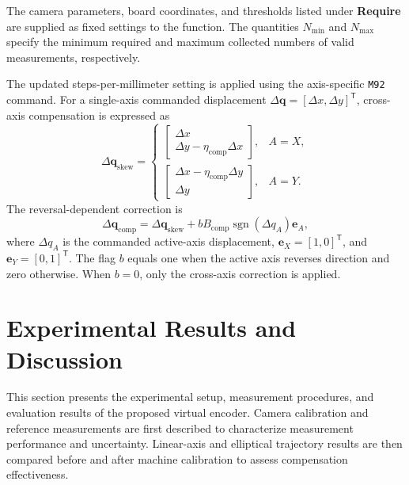 \documentclass[journal]{IEEEtran}
\begin{document}
The camera parameters, board coordinates, and thresholds
listed under \textbf{Require} are supplied as fixed
settings to the function.
The quantities $N_{\mathrm{min}}$ and $N_{\mathrm{max}}$
specify the minimum required and maximum collected
numbers of valid measurements, respectively.

The updated steps-per-millimeter setting is applied
using the axis-specific \texttt{M92} command.
For a single-axis commanded displacement
$\Delta\mathbf q=[\Delta x,\Delta y]^{\mathsf T}$,
cross-axis compensation is expressed as
\begin{equation}
\label{eq:cross_axis_compensation}
\Delta\mathbf q_{\mathrm{skew}}
=
\begin{cases}
\begin{bmatrix}
\Delta x\\
\Delta y-\eta_{\mathrm{comp}}\Delta x
\end{bmatrix},
& A=X,\\[6pt]
\begin{bmatrix}
\Delta x-\eta_{\mathrm{comp}}\Delta y\\
\Delta y
\end{bmatrix},
& A=Y.
\end{cases}
\end{equation}
The reversal-dependent correction is
\begin{equation}
\label{eq:backlash_command_compensation}
\Delta\mathbf q_{\mathrm{comp}}
=
\Delta\mathbf q_{\mathrm{skew}}
+
bB_{\mathrm{comp}}
\operatorname{sgn}(\Delta q_A)\mathbf e_A,
\end{equation}
where $\Delta q_A$ is the commanded active-axis
displacement, $\mathbf e_X=[1,0]^{\mathsf T}$,
and $\mathbf e_Y=[0,1]^{\mathsf T}$.
The flag $b$ equals one when the active axis
reverses direction and zero otherwise.
When $b=0$, only the cross-axis correction is applied.



\section{Experimental Results and Discussion}
\label{sec:experiment}
This section presents the experimental setup,
measurement procedures, and evaluation results
of the proposed virtual encoder.
Camera calibration and reference measurements
are first described to characterize measurement
performance and uncertainty.
Linear-axis and elliptical trajectory results
are then compared before and after machine
calibration to assess compensation effectiveness.
\end{document}
